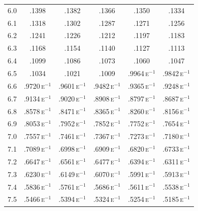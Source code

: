 \begin{minipage}[t]{95mm}
{\begin{tabular}{cccccc}
        6.0            & .1398                    & .1382                    & .1366                    & .1350                    & .1334                    \\
        6.1            & .1318                    & .1302                    & .1287                    & .1271                    & .1256                    \\
        6.2            & .1241                    & .1226                    & .1212                    & .1197                    & .1183                    \\
        6.3            & .1168                    & .1154                    & .1140                    & .1127                    & .1113                    \\
        6.4            & .1099                    & .1086                    & .1073                    & .1060                    & .1047                    \\
        6.5            & .1034                    & .1021                    & .1009                    & .9964\,\textsc{e}$^{-1}$ & .9842\,\textsc{e}$^{-1}$ \\
        6.6            & .9720\,\textsc{e}$^{-1}$ & .9601\,\textsc{e}$^{-1}$ & .9482\,\textsc{e}$^{-1}$ & .9365\,\textsc{e}$^{-1}$ & .9248\,\textsc{e}$^{-1}$ \\
        6.7            & .9134\,\textsc{e}$^{-1}$ & .9020\,\textsc{e}$^{-1}$ & .8908\,\textsc{e}$^{-1}$ & .8797\,\textsc{e}$^{-1}$ & .8687\,\textsc{e}$^{-1}$ \\
        6.8            & .8578\,\textsc{e}$^{-1}$ & .8471\,\textsc{e}$^{-1}$ & .8365\,\textsc{e}$^{-1}$ & .8260\,\textsc{e}$^{-1}$ & .8156\,\textsc{e}$^{-1}$ \\
        6.9            & .8053\,\textsc{e}$^{-1}$ & .7952\,\textsc{e}$^{-1}$ & .7852\,\textsc{e}$^{-1}$ & .7752\,\textsc{e}$^{-1}$ & .7654\,\textsc{e}$^{-1}$ \\[1.5ex]
        7.0            & .7557\,\textsc{e}$^{-1}$ & .7461\,\textsc{e}$^{-1}$ & .7367\,\textsc{e}$^{-1}$ & .7273\,\textsc{e}$^{-1}$ & .7180\,\textsc{e}$^{-1}$ \\
        7.1            & .7089\,\textsc{e}$^{-1}$ & .6998\,\textsc{e}$^{-1}$ & .6909\,\textsc{e}$^{-1}$ & .6820\,\textsc{e}$^{-1}$ & .6733\,\textsc{e}$^{-1}$ \\
        7.2            & .6647\,\textsc{e}$^{-1}$ & .6561\,\textsc{e}$^{-1}$ & .6477\,\textsc{e}$^{-1}$ & .6394\,\textsc{e}$^{-1}$ & .6311\,\textsc{e}$^{-1}$ \\
        7.3            & .6230\,\textsc{e}$^{-1}$ & .6149\,\textsc{e}$^{-1}$ & .6070\,\textsc{e}$^{-1}$ & .5991\,\textsc{e}$^{-1}$ & .5913\,\textsc{e}$^{-1}$ \\
        7.4            & .5836\,\textsc{e}$^{-1}$ & .5761\,\textsc{e}$^{-1}$ & .5686\,\textsc{e}$^{-1}$ & .5611\,\textsc{e}$^{-1}$ & .5538\,\textsc{e}$^{-1}$ \\
        7.5            & .5466\,\textsc{e}$^{-1}$ & .5394\,\textsc{e}$^{-1}$ & .5324\,\textsc{e}$^{-1}$ & .5254\,\textsc{e}$^{-1}$ & .5185\,\textsc{e}$^{-1}$ \\
    \end{tabular}
    }
\end{minipage}%
